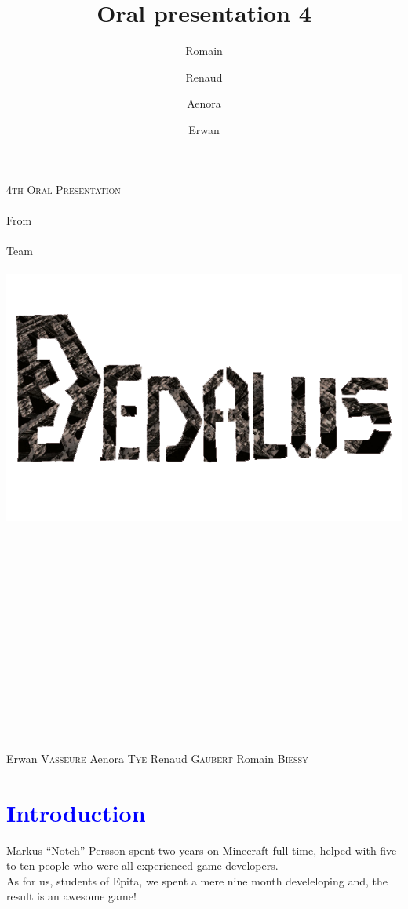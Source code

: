 \documentclass[article]{report}         %
\title {Oral presentation 4}
\author {Romain\and Renaud\and Aenora\and Erwan}
\date {}
\begin{document}
	\thispagestyle{empty}
  	\begin{titlepage} 
		\vspace*{1cm} 
  		\begin{center} 
  			{\huge{\textsc{4th Oral Presentation} \\ ~ \\{\large From}\\ ~\\ Team \\  ~ \\ }}
	  		\includegraphics[width = 14cm]{images/Titles/Dedalus.png}
			\\ ~ \\ ~ \\ ~ \\ ~ \\ ~ \\ ~ \\ ~ \\ ~ \\ ~ \\ ~ \\ ~ \\ ~ \\ ~ \\ ~ 
		\end{center}
			\hfill {\large Erwan  \textsc{Vasseure}}
			\hfill {\large Aenora \textsc{Tye}}
  		\hfill {\large Renaud \textsc{Gaubert}}
			\hfill {\large Romain \textsc{Biessy}}
  	\end{titlepage} 

  	\tableofcontents
  		\setcounter{page}{2}
  		\newpage
		\chapter{\textcolor{blue}{Introduction}}
      Markus ``Notch'' Persson spent two years on Minecraft full time, helped with five to ten people who were all experienced game developers. \\
      As for us, students of Epita, we spent a mere nine month develeloping and, the result is an awesome game!\\
\end{document}
